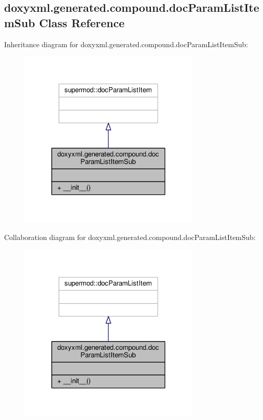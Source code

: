 \subsection{doxyxml.\+generated.\+compound.\+doc\+Param\+List\+Item\+Sub Class Reference}
\label{classdoxyxml_1_1generated_1_1compound_1_1docParamListItemSub}


Inheritance diagram for doxyxml.\+generated.\+compound.\+doc\+Param\+List\+Item\+Sub\+:
\nopagebreak
\begin{figure}[H]
\begin{center}
\leavevmode
\includegraphics[width=246pt]{df/d22/classdoxyxml_1_1generated_1_1compound_1_1docParamListItemSub__inherit__graph}
\end{center}
\end{figure}


Collaboration diagram for doxyxml.\+generated.\+compound.\+doc\+Param\+List\+Item\+Sub\+:
\nopagebreak
\begin{figure}[H]
\begin{center}
\leavevmode
\includegraphics[width=246pt]{da/d54/classdoxyxml_1_1generated_1_1compound_1_1docParamListItemSub__coll__graph}
\end{center}
\end{figure}
